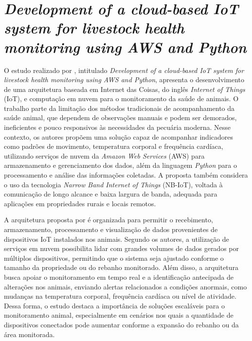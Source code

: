 \section{\textit{Development of a cloud-based IoT system for livestock health monitoring using AWS and Python}}
\label{sec:tr-bhaskaran2024}

O estudo realizado por , intitulado \textit{Development of a cloud-based IoT system for livestock health monitoring using AWS and Python}, apresenta o desenvolvimento de uma arquitetura baseada em Internet das Coisas, do inglês \textit{Internet of Things} (IoT), e computação em nuvem para o monitoramento da saúde de animais. O trabalho parte da limitação dos métodos tradicionais de acompanhamento da saúde animal, que dependem de observações manuais e podem ser demorados, ineficientes e pouco responsivos às necessidades da pecuária moderna. Nesse contexto, os autores propõem uma solução capaz de acompanhar indicadores como padrões de movimento, temperatura corporal e frequência cardíaca, utilizando serviços de nuvem da \textit{Amazon Web Services} (AWS) para armazenamento e gerenciamento dos dados, além da linguagem \textit{Python} para o processamento e análise das informações coletadas. A proposta também considera o uso da tecnologia \textit{Narrow Band Internet of Things} (NB-IoT), voltada à comunicação de longo alcance e baixa largura de banda, adequada para aplicações em propriedades rurais e locais remotos.

A arquitetura proposta por  é organizada para permitir o recebimento, armazenamento, processamento e visualização de dados provenientes de dispositivos IoT instalados nos animais. Segundo os autores, a utilização de serviços em nuvem possibilita lidar com grandes volumes de dados gerados por múltiplos dispositivos, permitindo que o sistema seja ajustado conforme o tamanho da propriedade ou do rebanho monitorado. Além disso, a arquitetura busca apoiar o monitoramento em tempo real e a identificação antecipada de alterações nos animais, enviando alertas relacionados a condições anormais, como mudanças na temperatura corporal, frequência cardíaca ou nível de atividade. Dessa forma, o estudo destaca a importância de soluções escaláveis para o monitoramento animal, especialmente em cenários nos quais a quantidade de dispositivos conectados pode aumentar conforme a expansão do rebanho ou da área monitorada.

